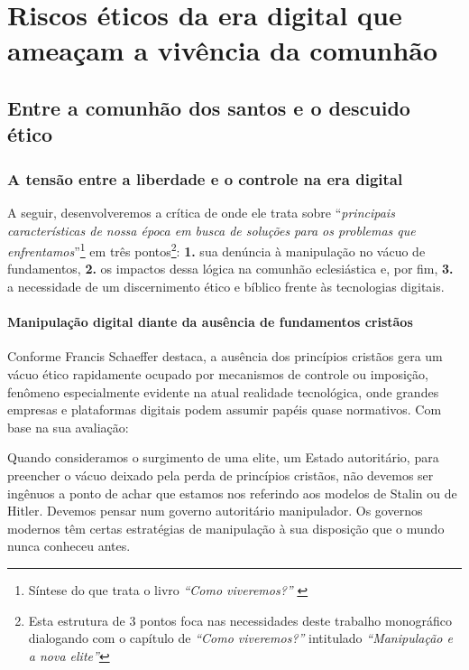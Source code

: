 \chapter{\nohyphens{Riscos éticos da era digital que ameaçam a vivência da comunhão}}

\section{Entre a comunhão dos santos e o descuido ético}

\subsection{A tensão entre a liberdade e o controle na era digital}

A seguir, desenvolveremos a crítica de  onde ele trata sobre ``\textit{principais características de nossa época em busca de soluções para os problemas que enfrentamos}''\footnote{Síntese do que trata o livro \textit{``Como viveremos?''} \cite{schaeffer2002}} em três pontos\footnote{Esta estrutura de 3 pontos foca nas necessidades deste trabalho monográfico dialogando com o capítulo de \textit{``Como viveremos?''} intitulado \textit{``Manipulação e a nova elite''}}: \textbf{1.} sua denúncia à manipulação no vácuo de fundamentos, \textbf{2.} os impactos dessa lógica na comunhão eclesiástica e, por fim, \textbf{3.} a necessidade de um discernimento ético e bíblico frente às tecnologias digitais.

\subsubsection{Manipulação digital diante da ausência de fundamentos cristãos}

Conforme Francis Schaeffer destaca, a ausência dos princípios cristãos gera um vácuo ético rapidamente ocupado por mecanismos de controle ou imposição, fenômeno especialmente evidente na atual realidade tecnológica, onde grandes empresas e plataformas digitais podem assumir papéis quase normativos. Com base na sua avaliação:

\begin{citacao}
    Quando consideramos o surgimento de uma elite, um Estado autoritário, para preencher o vácuo deixado pela perda de princípios cristãos, não devemos ser ingênuos a ponto de achar que estamos nos referindo aos modelos de Stalin ou de Hitler. Devemos pensar num governo autoritário manipulador. Os governos modernos têm certas estratégias de manipulação à sua disposição que o mundo nunca conheceu antes. \cite[p.~168]{schaeffer2002}
\end{citacao}

